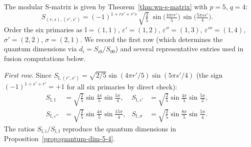 \begin{computation}\label{comp:s-matrix-5-4}
The modular S-matrix is given by Theorem~\ref{thm:wn-s-matrix} with $p=5$, $q=4$:
\begin{equation}\label{eq:s-matrix-5-4-formula}
S_{(r,s),(r',s')} = (-1)^{1+rs'+r's}\,\sqrt{\tfrac{2}{5}}\;
\sin\!\bigl(\tfrac{4\pi r r'}{5}\bigr)\,
\sin\!\bigl(\tfrac{5\pi s s'}{4}\bigr).
\end{equation}
Order the six primaries as $\mathbb{I}=(1,1)$, $\varepsilon'=(1,2)$,
$\varepsilon''=(1,3)$, $\varepsilon'''=(1,4)$, $\sigma'=(2,2)$, $\sigma=(2,1)$.
We record the first row (which determines the quantum dimensions via $d_i = S_{i0}/S_{00}$)
and several representative entries used in fusion computations below.

\emph{First row.}  Since $S_{\mathbb{I},(r',s')} = \sqrt{2/5}\sin(4\pi r'/5)\sin(5\pi s'/4)$
(the sign $(-1)^{1+s'+r'} = +1$ for all six primaries by direct check):
\begin{align}
S_{\mathbb{I},\mathbb{I}} &= \sqrt{\tfrac{2}{5}}\sin\tfrac{4\pi}{5}\sin\tfrac{5\pi}{4}, &
S_{\mathbb{I},\varepsilon'} &= \sqrt{\tfrac{2}{5}}\sin\tfrac{4\pi}{5}\sin\tfrac{5\pi}{2}, \\
S_{\mathbb{I},\varepsilon''} &= \sqrt{\tfrac{2}{5}}\sin\tfrac{4\pi}{5}\sin\tfrac{15\pi}{4}, &
S_{\mathbb{I},\sigma} &= \sqrt{\tfrac{2}{5}}\sin\tfrac{8\pi}{5}\sin\tfrac{5\pi}{4}.
\end{align}
The ratios $S_{\mathbb{I},i}/S_{\mathbb{I},\mathbb{I}}$ reproduce the quantum dimensions in
Proposition~\ref{prop:quantum-dim-5-4}.
\end{computation}

